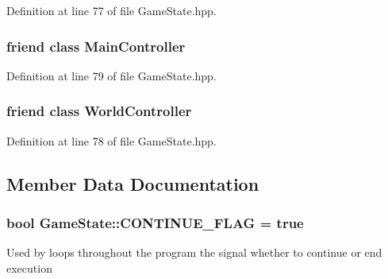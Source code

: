Definition at line 77 of file Game\-State.\-hpp.

\hypertarget{struct_game_state_a154f5ffe46dc74c6c94311b4cc3927ae}{
\subsubsection[{Main\-Controller}]{\setlength{\rightskip}{0pt plus 5cm}friend class {\bf Main\-Controller}\hspace{0.3cm}{\ttfamily [friend]}}}\label{struct_game_state_a154f5ffe46dc74c6c94311b4cc3927ae}


Definition at line 79 of file Game\-State.\-hpp.

\hypertarget{struct_game_state_a19ecfd085a11c42d868e25c796419df8}{
\subsubsection[{World\-Controller}]{\setlength{\rightskip}{0pt plus 5cm}friend class {\bf World\-Controller}\hspace{0.3cm}{\ttfamily [friend]}}}\label{struct_game_state_a19ecfd085a11c42d868e25c796419df8}


Definition at line 78 of file Game\-State.\-hpp.



\subsection{Member Data Documentation}
\hypertarget{struct_game_state_a58ee23ac0938d8499250b971f8e1d2d0}{
\subsubsection[{C\-O\-N\-T\-I\-N\-U\-E\-\_\-\-F\-L\-A\-G}]{\setlength{\rightskip}{0pt plus 5cm}bool Game\-State\-::\-C\-O\-N\-T\-I\-N\-U\-E\-\_\-\-F\-L\-A\-G = true\hspace{0.3cm}{\ttfamily [static]}}}\label{struct_game_state_a58ee23ac0938d8499250b971f8e1d2d0}
Used by loops throughout the program the signal whether to continue or end execution 

